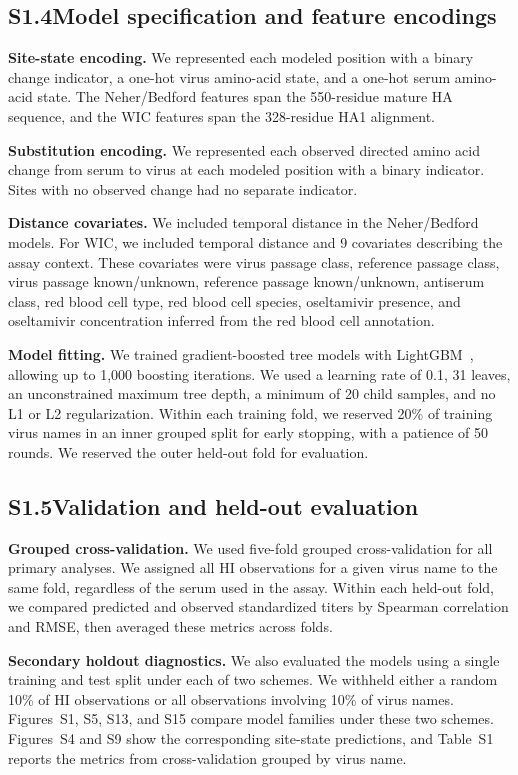 \documentclass[12pt]{article}
\begin{document}
\subsection*{S1.4\quad Model specification and feature encodings}

\textbf{Site-state encoding.} We represented each modeled position with a binary change indicator, a one-hot virus amino-acid state, and a one-hot serum amino-acid state. The Neher/Bedford features span the 550-residue mature HA sequence, and the WIC features span the 328-residue HA1 alignment.

\textbf{Substitution encoding.} We represented each observed directed amino acid change from serum to virus at each modeled position with a binary indicator. Sites with no observed change had no separate indicator.

\textbf{Distance covariates.} We included temporal distance in the Neher/Bedford models. For WIC, we included temporal distance and 9 covariates describing the assay context. These covariates were virus passage class, reference passage class, virus passage known/unknown, reference passage known/unknown, antiserum class, red blood cell type, red blood cell species, oseltamivir presence, and oseltamivir concentration inferred from the red blood cell annotation.

\textbf{Model fitting.} We trained gradient-boosted tree models with LightGBM~\cite{Ke2017LightGBM}, allowing up to 1,000 boosting iterations. We used a learning rate of 0.1, 31 leaves, an unconstrained maximum tree depth, a minimum of 20 child samples, and no L1 or L2 regularization. Within each training fold, we reserved 20\% of training virus names in an inner grouped split for early stopping, with a patience of 50 rounds. We reserved the outer held-out fold for evaluation.

\subsection*{S1.5\quad Validation and held-out evaluation}

\textbf{Grouped cross-validation.} We used five-fold grouped cross-validation for all primary analyses. We assigned all HI observations for a given virus name to the same fold, regardless of the serum used in the assay. Within each held-out fold, we compared predicted and observed standardized titers by Spearman correlation and RMSE, then averaged these metrics across folds.

\textbf{Secondary holdout diagnostics.} We also evaluated the models using a single training and test split under each of two schemes. We withheld either a random 10\% of HI observations or all observations involving 10\% of virus names. Figures~S1, S5, S13, and S15 compare model families under these two schemes. Figures~S4 and S9 show the corresponding site-state predictions, and Table~S1 reports the metrics from cross-validation grouped by virus name.
\end{document}
